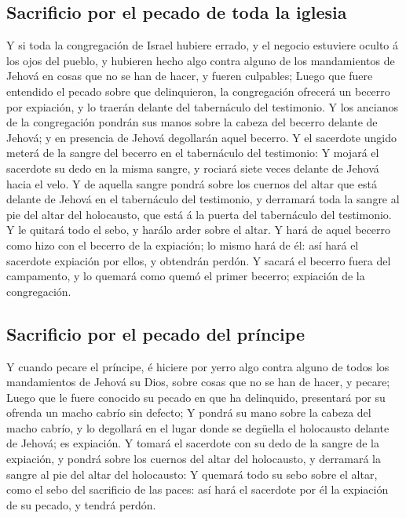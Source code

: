 \hypertarget{sacrificio-por-el-pecado-de-toda-la-iglesia}{%
\subsection{Sacrificio por el pecado de toda la
iglesia}\label{sacrificio-por-el-pecado-de-toda-la-iglesia}}

 Y si toda la congregación de Israel hubiere errado, y el
negocio estuviere oculto á los ojos del pueblo, y hubieren hecho algo
contra alguno de los mandamientos de Jehová en cosas que no se han de
hacer, y fueren culpables;  Luego que fuere entendido el
pecado sobre que delinquieron, la congregación ofrecerá un becerro por
expiación, y lo traerán delante del tabernáculo del testimonio.
 Y los ancianos de la congregación pondrán sus manos
sobre la cabeza del becerro delante de Jehová; y en presencia de Jehová
degollarán aquel becerro.  Y el sacerdote ungido meterá
de la sangre del becerro en el tabernáculo del testimonio:
 Y mojará el sacerdote su dedo en la misma sangre, y
rociará siete veces delante de Jehová hacia el velo.  Y
de aquella sangre pondrá sobre los cuernos del altar que está delante de
Jehová en el tabernáculo del testimonio, y derramará toda la sangre al
pie del altar del holocausto, que está á la puerta del tabernáculo del
testimonio.  Y le quitará todo el sebo, y harálo arder
sobre el altar.  Y hará de aquel becerro como hizo con el
becerro de la expiación; lo mismo hará de él: así hará el sacerdote
expiación por ellos, y obtendrán perdón.  Y sacará el
becerro fuera del campamento, y lo quemará como quemó el primer becerro;
expiación de la congregación.

\hypertarget{sacrificio-por-el-pecado-del-pruxedncipe}{%
\subsection{Sacrificio por el pecado del
príncipe}\label{sacrificio-por-el-pecado-del-pruxedncipe}}

 Y cuando pecare el príncipe, é hiciere por yerro algo
contra alguno de todos los mandamientos de Jehová su Dios, sobre cosas
que no se han de hacer, y pecare;  Luego que le fuere
conocido su pecado en que ha delinquido, presentará por su ofrenda un
macho cabrío sin defecto;  Y pondrá su mano sobre la
cabeza del macho cabrío, y lo degollará en el lugar donde se degüella el
holocausto delante de Jehová; es expiación.  Y tomará el
sacerdote con su dedo de la sangre de la expiación, y pondrá sobre los
cuernos del altar del holocausto, y derramará la sangre al pie del altar
del holocausto:  Y quemará todo su sebo sobre el altar,
como el sebo del sacrificio de las paces: así hará el sacerdote por él
la expiación de su pecado, y tendrá perdón.

